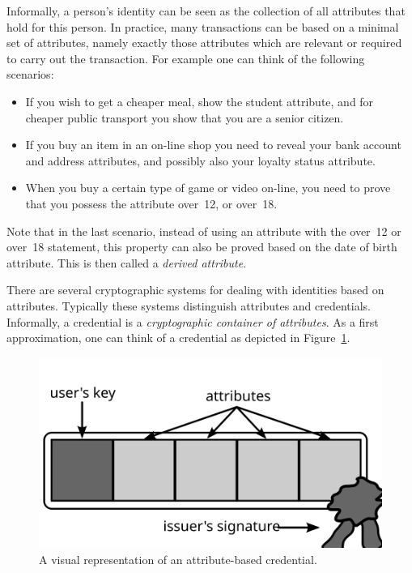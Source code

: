 Informally, a person's identity can be seen as the collection
of all attributes that hold for this person. In practice, many
transactions can be based on a minimal set of attributes, namely exactly those
attributes which are relevant or required to carry out the transaction. For
example one can think of the following scenarios:
\begin{itemize}
  \item If you wish to get a cheaper meal, show the \textsf{student} attribute,
    and for cheaper public transport you show that you are a \textsf{senior
    citizen}.
  \item If you buy an item in an on-line shop you need to reveal your
    \textsf{bank account} and \textsf{address} attributes, and possibly also
    your \textsf{loyalty status} attribute.
  \item When you buy a certain type of game or video on-line, you need to
    prove that you possess the attribute \textsf{over~12}, or \textsf{over~18}.
\end{itemize}
Note that in the last scenario, instead of using an attribute with the
\textsf{over~12} or \textsf{over~18} statement,
 this property can also be proved
based on the \textsf{date of birth} attribute. This is then called a
\emph{derived attribute}.

There are several cryptographic systems for dealing with identities
 based on attributes. Typically these systems
distinguish attributes and credentials. Informally, a credential
 is a \emph{cryptographic container  of attributes}. As a first approximation, one can think of a
credential as depicted in Figure~\ref{fig:Credential}.

\begin{figure}[ht]
  \centering
  \includegraphics[scale=.5]{images/credential}
  \caption{A visual representation of an attribute-based credential.}
  \label{fig:Credential}
\end{figure}

